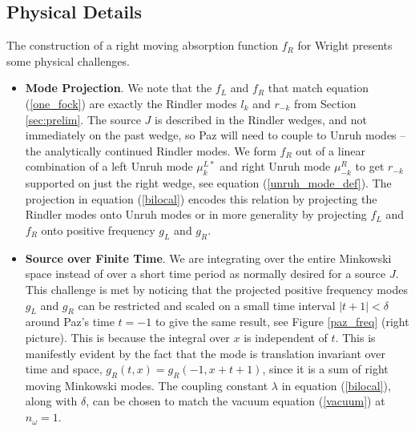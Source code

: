 \documentclass[12pt,a4paper]{article}
\begin{document}
{\subsection{Physical Details} \label{sec:drive_phy}

The construction of a right moving absorption function $f_R$ for Wright presents some physical challenges.

\begin{itemize}
\item {\bf Mode Projection}. We note that the $f_L$ and $f_R$ that match equation (\ref{one_fock}) are exactly the Rindler modes $l_k$ and $r_{-k}$ from Section \ref{sec:prelim}. The source $J$ is described in the Rindler wedges, and not immediately on the past wedge, so Paz will need to couple to Unruh modes -- the analytically continued Rindler modes.  We form $f_R$ out of a linear combination of a left Unruh mode $\mu^{L*}_{k}$ and right Unruh mode $\mu^R_{-k}$ to get $r_{-k}$ supported on just the right wedge, see equation (\ref{unruh_mode_def}).  The projection in equation (\ref{bilocal}) encodes this relation by projecting the Rindler modes onto Unruh modes or in more generality by projecting $f_L$ and $f_R$ onto positive frequency $g_L$ and $g_R$.

\item{\bf Source over Finite Time}. We are integrating over the entire Minkowski space instead of over a short time period as normally desired for a source $J$.  This challenge is met by noticing that the projected positive frequency modes $g_L$ and $g_R$ can be restricted and scaled on a small time interval $|t + 1| < \delta$ around Paz's time $t=-1$ to give the same result, see Figure \ref{paz_freq} (right picture). This is because the integral over $x$ is independent of $t$. This is manifestly evident by the fact that the mode is translation invariant over time and space, $g_R(t,x) = g_R(-1,x+t+1)$, since it is a sum of right moving Minkowski modes. The coupling constant $\lambda$ in equation (\ref{bilocal}), along with $\delta$, can be chosen to match the vacuum equation (\ref{vacuum}) at $n_\omega = 1$.


\end{itemize}}
\end{document}
